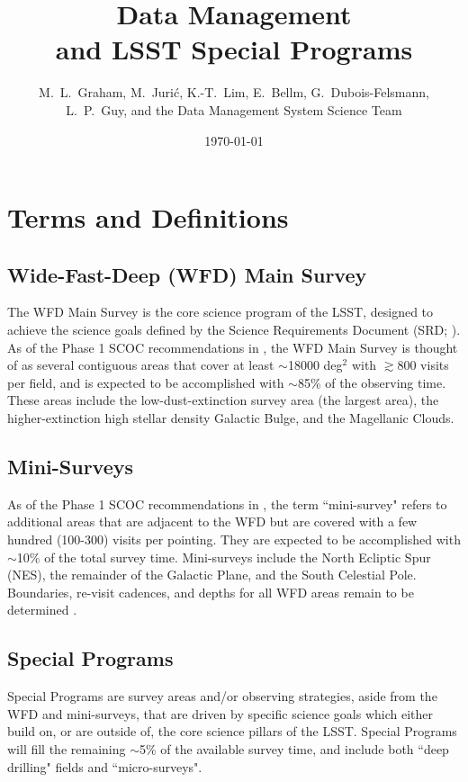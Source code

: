 \documentclass[DM,lsstdoc,toc]{lsstdoc}
\title[LSST Special Programs]{Data Management \\ and LSST Special Programs}
\author{M.~L.~Graham, M.~Juri\'{c}, K.-T.~Lim, E.~Bellm, G.~Dubois-Felsmann, L.~P.~Guy, and the Data Management System Science Team}
\date{\today}
\begin{document}
\maketitle


\section{Terms and Definitions} \label{sec:terms}

\subsection{Wide-Fast-Deep (WFD) Main Survey}\label{ssec:terms_wfd}
The WFD Main Survey is the core science program of the LSST, designed to achieve the science goals defined by the Science Requirements Document (SRD; ).
As of the Phase 1 SCOC recommendations in , the WFD Main Survey is thought of as several contiguous areas that cover at least $\sim$18000 deg$^2$ with $\gtrsim$800 visits per field, and is expected to be accomplished with $\sim$85\% of the observing time.
These areas include the low-dust-extinction survey area (the largest area), the higher-extinction high stellar density Galactic Bulge, and the Magellanic Clouds.

\subsection{Mini-Surveys}\label{sssec:terms_wfd_mini}
As of the Phase 1 SCOC recommendations in , the term ``mini-survey" refers to additional areas that are adjacent to the WFD but are covered with a few hundred (100-300) visits per pointing.
They are expected to be accomplished with $\sim$10\% of the total survey time.
Mini-surveys include the North Ecliptic Spur (NES), the remainder of the Galactic Plane, and the South Celestial Pole.
Boundaries, re-visit cadences, and depths for all WFD areas remain to be determined .

\subsection{Special Programs}\label{ssec:terms_sp}
Special Programs are survey areas and/or observing strategies, aside from the WFD and mini-surveys, that are driven by specific science goals which either build on, or are outside of, the core science pillars of the LSST.
Special Programs will fill the remaining $\sim$5\% of the available survey time, and include both ``deep drilling" fields and ``micro-surveys".
\end{document}
